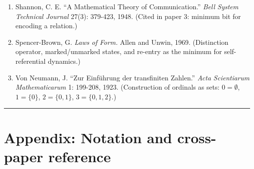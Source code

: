 \documentclass[12pt]{article}
\begin{document}
\begin{enumerate}
  Peirce, C. S. \emph{Collected Papers of Charles Sanders Peirce.} Vol.
  1. Harvard University Press, 1931. (§§300-353: Categories of
  Firstness, Secondness, Thirdness; §346: formal irreducibility of
  Thirdness.)
\item
  Shannon, C. E. ``A Mathematical Theory of Communication.'' \emph{Bell
  System Technical Journal} 27(3): 379-423, 1948. (Cited in paper 3:
  minimum bit for encoding a relation.)
\item
  Spencer-Brown, G. \emph{Laws of Form.} Allen and Unwin, 1969.
  (Distinction operator, marked/unmarked states, and re-entry as the
  minimum for self-referential dynamics.)
\item
  Von Neumann, J. ``Zur Einführung der transfiniten Zahlen.'' \emph{Acta
  Scientiarum Mathematicarum} 1: 199-208, 1923. (Construction of
  ordinals as sets: \(0 = \emptyset\), \(1 = \{0\}\), \(2 = \{0,1\}\),
  \(3 = \{0,1,2\}\).)
\end{enumerate}

\begin{center}\rule{0.5\linewidth}{0.5pt}\end{center}

\section{Appendix: Notation and cross-paper
reference}\label{appendix-notation-and-cross-paper-reference}
\end{document}
